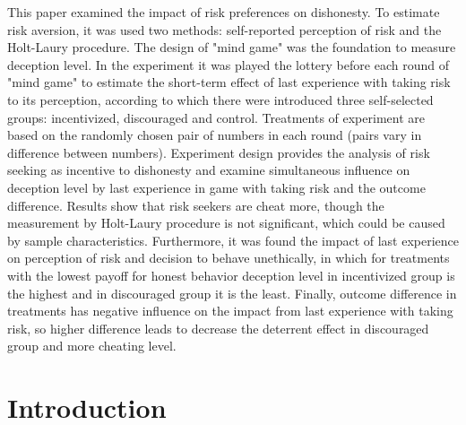 \documentclass[12pt]{article}
\begin{document}
\begin{titlepage}
	This paper examined the impact of risk preferences on dishonesty. To estimate risk aversion, it was used two methods: self-reported perception of risk and the Holt-Laury procedure. The design of "mind game" was the foundation to measure deception level. In the experiment it was played the lottery before each round of "mind game" to estimate the short-term effect of last experience with taking risk to its perception, according to which there were introduced three self-selected groups: incentivized, discouraged and control. Treatments of experiment are based on the randomly chosen pair of numbers in each round (pairs vary in difference between numbers). Experiment design provides the analysis of risk seeking as incentive to dishonesty and examine simultaneous influence on deception level by last experience in game with taking risk and the outcome difference. Results show that risk seekers are cheat more, though the measurement by Holt-Laury procedure is not significant, which could be caused by sample characteristics. Furthermore, it was found the impact of last experience on perception of risk and decision to behave unethically, in which for treatments with the lowest payoff for honest behavior deception level in incentivized group is the highest and in discouraged group it is the least. Finally, outcome difference in treatments has negative influence on the impact from last experience with taking risk, so higher difference leads to decrease the deterrent effect in discouraged group and more cheating level.

		
	
		\vfill %
		
	\end{titlepage}

	\section{Introduction}
	\vspace{-0.4cm}
	
\end{document}
